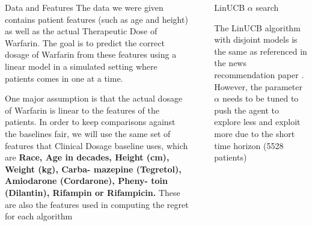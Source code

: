 \documentclass[final, 14pt]{beamer}
\newlength{\sepwid}
\newlength{\onecolwid}
\newlength{\twocolwid}
\begin{document}
\begin{frame}[t]
\begin{columns}[t]
\begin{column}{\onecolwid}
\begin{block}{Data and Features}
The data we were given contains patient features (such as age and height) as well as the actual Therapeutic Dose of Warfarin. The goal is to predict the correct dosage of Warfarin from these features using a linear model in a simulated setting where patients comes in one at a time.

One major assumption is that the actual dosage of Warfarin is linear to the features of the patients. In order to keep comparisons against the baselines fair, we will use the same set of features that Clinical Dosage baseline uses, which are \textbf{Race, Age in decades, Height (cm), Weight (kg), Carba- mazepine (Tegretol), Amiodarone (Cordarone), Pheny- toin (Dilantin), Rifampin or Rifampicin.} These are also the features used in computing the regret for each algorithm

\end{block}


\end{column} %

\begin{column}{\sepwid}\end{column} %

\begin{column}{\twocolwid} %

\begin{columns}[t,totalwidth=\twocolwid] %

\begin{column}{\onecolwid}\vspace{-.6in} %


\begin{block}{LinUCB $\alpha$ search}

The LinUCB algorithm with disjoint models is the same as referenced in the news recommendation paper \cite{li2010contextual}. However, the parameter $\alpha$ needs to be tuned to push the agent to explore less and exploit more due to the short time horizon (5528 patients)


\end{block}
\end{column}
\end{columns}
\end{column}
\end{columns}
\end{frame}
\end{document}
